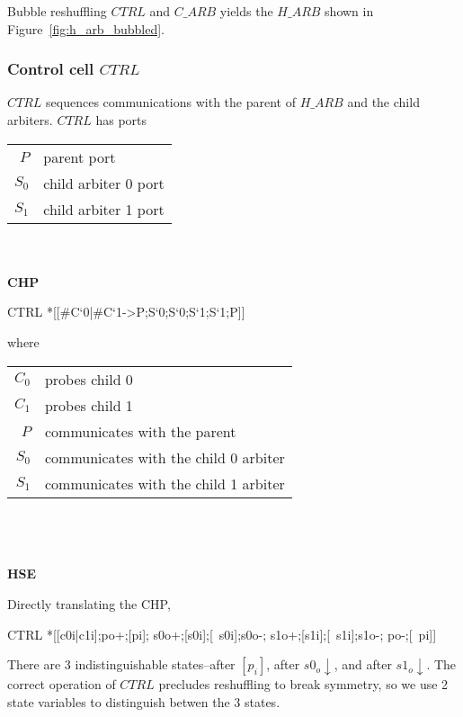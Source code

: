 \documentclass[aer.tex]{subfiles}
\begin{document}
\noindent Bubble reshuffling $CTRL$ and $C\_ARB$ yields the $H\!\_ARB$ shown in Figure~\ref{fig:h_arb_bubbled}.

\subsubsection{Control cell $CTRL$}
$CTRL$ sequences communications with the parent of $H\!\_ARB$ and the child arbiters.
$CTRL$ has ports

\begin{tabular}[]{rl}
$P$ & parent port \\
$S_0$ & child arbiter 0 port \\
$S_1$ & child arbiter 1 port \\
\end{tabular} \\

\noindent \\ \textbf{CHP}

\begin{csp}
CTRL\equiv
  *[[#{C`0}|#{C`1}->P;S`0;S`0;S`1;S`1;P]]
\end{csp}

\noindent where 

\begin{tabular}[]{rl}
  $C_0$ & probes child 0 \\
  $C_1$ & probes child 1 \\
  $P$ & communicates with the parent \\
  $S_0$ & communicates with the child 0 arbiter \\
  $S_1$ & communicates with the child 1 arbiter \\
\end{tabular} \\ \\

\noindent \\ \textbf{HSE}

\noindent Directly translating the CHP,

\begin{hse}
CTRL\equiv
  *[[c0i|c1i];po+;[pi];
    s0o+;[s0i];[~s0i];s0o-;
    s1o+;[s1i];[~s1i];s1o-;
    po-;[~pi]]
\end{hse}

\noindent There are 3 indistinguishable states--after $[p_i]$, after $s0_o\!\downarrow$, and after $s1_o\!\downarrow$. The correct operation of $CTRL$ precludes reshuffling to break symmetry, so we use 2 state variables to distinguish betwen the 3 states.
\end{document}
